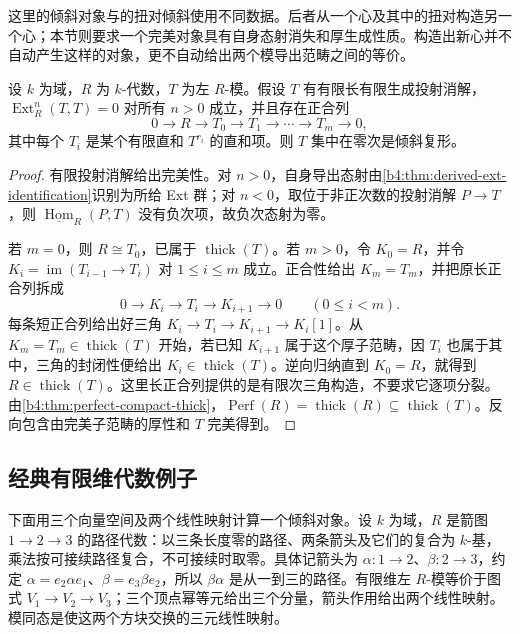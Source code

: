 \ProseParagraphBreak
这里的倾斜对象与的扭对倾斜使用不同数据。后者从一个心及其中的扭对构造另一个心；本节则要求一个完美对象具有自身态射消失和厚生成性质。构造出新心并不自动产生这样的对象，更不自动给出两个模导出范畴之间的等价。

\begin{proposition}\label{b4:prop:tilting-module-criterion}
	设 \(k\) 为域，\(R\) 为 \(k\)-代数，\(T\) 为左 \(R\)-模。假设 \(T\) 有有限长有限生成投射消解，\(\operatorname{Ext}^n_R(T,T)=0\) 对所有 \(n>0\) 成立，并且存在正合列
	\[
		0\longrightarrow R\longrightarrow T_0\longrightarrow T_1 \longrightarrow\cdots\longrightarrow T_m\longrightarrow0,
	\]
	其中每个 \(T_i\) 是某个有限直和 \(T^{r_i}\) 的直和项。则 \(T\) 集中在零次是倾斜复形。
\end{proposition}
\begin{proof}
	有限投射消解给出完美性。对 \(n>0\)，自身导出态射由\cref{b4:thm:derived-ext-identification}识别为所给 Ext 群；对 \(n<0\)，取位于非正次数的投射消解 \(P\to T\)，则 \(\underline{\operatorname{Hom}}_R(P,T)\) 没有负次项，故负次态射为零。

	若 \(m=0\)，则 \(R\cong T_0\)，已属于 \(\operatorname{thick}(T)\)。若 \(m>0\)，令 \(K_0=R\)，并令 \(K_i=\operatorname{im}(T_{i-1}\to T_i)\) 对 \(1\le i\le m\) 成立。正合性给出 \(K_m=T_m\)，并把原长正合列拆成
	\[
		0\longrightarrow K_i\longrightarrow T_i\longrightarrow K_{i+1} \longrightarrow0\qquad(0\le i<m).
	\]
	每条短正合列给出好三角 \(K_i\to T_i\to K_{i+1}\to K_i[1]\)。从 \(K_m=T_m\in\operatorname{thick}(T)\) 开始，若已知 \(K_{i+1}\) 属于这个厚子范畴，因 \(T_i\) 也属于其中，三角的封闭性便给出 \(K_i\in\operatorname{thick}(T)\)。逆向归纳直到 \(K_0=R\)，就得到 \(R\in\operatorname{thick}(T)\)。这里长正合列提供的是有限次三角构造，不要求它逐项分裂。由\cref{b4:thm:perfect-compact-thick}，\(\operatorname{Perf}(R)=\operatorname{thick}(R)\subseteq\operatorname{thick}(T)\)。反向包含由完美子范畴的厚性和 \(T\) 完美得到。
\end{proof}

\subsection{经典有限维代数例子}
\label{b4:subsec:2003:02}

下面用三个向量空间及两个线性映射计算一个倾斜对象。设 \(k\) 为域，\(R\) 是箭图 \(1\to2\to3\) 的路径代数：以三条长度零的路径、两条箭头及它们的复合为 \(k\)-基，乘法按可接续路径复合，不可接续时取零。具体记箭头为 \(\alpha:1\to2\)、\(\beta:2\to3\)，约定 \(\alpha=e_2\alpha e_1\)、\(\beta=e_3\beta e_2\)，所以 \(\beta\alpha\) 是从一到三的路径。有限维左 \(R\)-模等价于图式 \(V_1\to V_2\to V_3\)；三个顶点幂等元给出三个分量，箭头作用给出两个线性映射。模同态是使这两个方块交换的三元线性映射。

